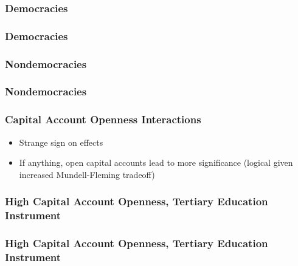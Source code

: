 \documentclass{beamer}
\begin{document}
    \begin{frame}
        \frametitle{Democracies}
        {
            \let\oldcentering\centering
            \renewcommand\centering{\tiny\oldcentering}
            
        }
    \end{frame}

    \begin{frame}
        \frametitle{Democracies}
        {
            \let\oldcentering\centering
            \renewcommand\centering{\tiny\oldcentering}
            
        }
    \end{frame}

    \begin{frame}
        \frametitle{Nondemocracies}
        {
            \let\oldcentering\centering
            \renewcommand\centering{\tiny\oldcentering}
            
        }
    \end{frame}

    \begin{frame}
        \frametitle{Nondemocracies}
        {
            \let\oldcentering\centering
            \renewcommand\centering{\tiny\oldcentering}
            
        }
    \end{frame}

    \begin{frame}
        \frametitle{Capital Account Openness Interactions}
        \begin{itemize}
            \item Strange sign on effects
            \item If anything, open capital accounts lead to more significance (logical given increased Mundell-Fleming tradeoff)
        \end{itemize}
    \end{frame}

    \begin{frame}
        \frametitle{High Capital Account Openness, Tertiary Education Instrument}
        {
            \let\oldcentering\centering
            \renewcommand\centering{\tiny\oldcentering}
            
        }
    \end{frame}

    \begin{frame}
        \frametitle{High Capital Account Openness, Tertiary Education Instrument}
        {
            \let\oldcentering\centering
            \renewcommand\centering{\tiny\oldcentering}
            
        }
    \end{frame}
\end{document}
